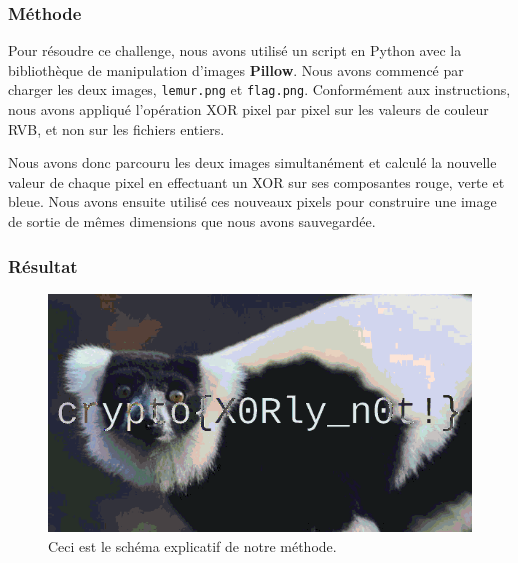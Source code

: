 \documentclass[12pt, a4paper]{article}
\begin{document}
        \subsubsection{Méthode}
        
        Pour résoudre ce challenge, nous avons utilisé un script en Python avec la bibliothèque de manipulation d'images \textbf{Pillow}. Nous avons commencé par charger les deux images, \texttt{lemur.png} et \texttt{flag.png}. Conformément aux instructions, nous avons appliqué l'opération XOR pixel par pixel sur les valeurs de couleur RVB, et non sur les fichiers entiers.
        
        Nous avons donc parcouru les deux images simultanément et calculé la nouvelle valeur de chaque pixel en effectuant un XOR sur ses composantes rouge, verte et bleue. Nous avons ensuite utilisé ces nouveaux pixels pour construire une image de sortie de mêmes dimensions que nous avons sauvegardée.
        
        \subsubsection{Résultat}
        
            \begin{figure}[H]
                \centering
                \includegraphics[width=0.8\linewidth]{Images/Lemur/xored_result.png}
                
                \caption{Ceci est le schéma explicatif de notre méthode.}
                
                \label{fig:encodeChallRes}
            \end{figure}
\end{document}
